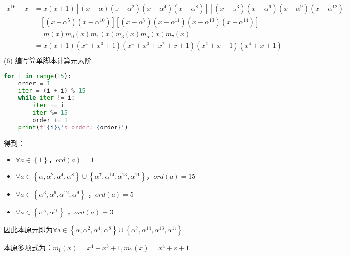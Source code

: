 \begin{Solution}
$
\begin{aligned}
    x^{16}- x   &= x (x+1) \left[(x-\alpha)(x-\alpha^2)(x-\alpha^4)(x-\alpha^8)\right]\left[(x-\alpha^3)(x-\alpha^6)(x-\alpha^9)(x-\alpha^{12})\right]\\
                &~~~~\left[(x-\alpha^5)(x-\alpha^{10})\right]\left[(x-\alpha^7)(x-\alpha^{11})(x-\alpha^{13})(x-\alpha^{14})\right]\\
                &= m(x)m_0(x)m_1(x)m_3(x)m_5(x)m_7(x)\\
                &= x(x+1)(x^4 + x^3 + 1)(x^4 + x^3 + x^2 + x + 1)(x^2 + x + 1)(x^4 + x + 1)\\
\end{aligned}
$\\

(6) 编写简单脚本计算元素阶
\begin{lstlisting}[language = Python]
for i in range(15):
    order = 1
    iter = (i + i) % 15
    while iter != i:
        iter += i
        iter %= 15
        order += 1
    print(f'{i}\'s order: {order}')
\end{lstlisting}
得到：

\begin{itemize}
    


    \item $\forall a \in                                                            
\left\{ 1\right\}$，$ord(a) = 1$

\item $\forall a \in 
\left\{ \alpha, \alpha^2, \alpha^4, \alpha^8\right\}                                                
\cup \left\{ \alpha^{7}, \alpha^{14}, \alpha^{13}, \alpha^{11}\right\}$，$ord(a) = 15$

\item $\forall a \in\left\{ \alpha^{3}, \alpha^{6}, \alpha^{12}, \alpha^{9}\right\}$       
，$ord(a) = 5$

\item $\forall a \in\left\{ \alpha^{5}, \alpha^{10}\right\}$
，$ord(a) = 3$

\end{itemize}

因此本原元即为$\forall a \in \left\{ \alpha, \alpha^2, \alpha^4, \alpha^8\right\}                                                
\cup \left\{ \alpha^{7}, \alpha^{14}, \alpha^{13}, \alpha^{11}\right\}$

本原多项式为：$m_1(x)=x^4 + x^3 + 1, m_7(x)=x^4 + x + 1$
\end{Solution}

